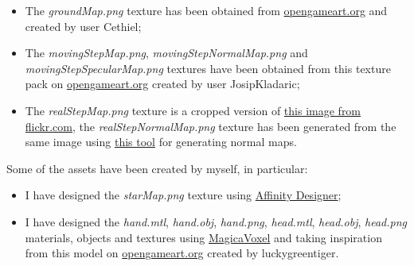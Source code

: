 \documentclass[12pt]{article}
\begin{document}
\begin{itemize}
\item The \textit{groundMap.png} texture has been obtained from \href{https://opengameart.org/content/tileable-bricks-ground-textures-set-1}{opengameart.org} and created by user Cethiel;
\item The \textit{movingStepMap.png}, \textit{movingStepNormalMap.png} and \textit{movingStepSpecularMap.png} textures have been obtained from this texture pack on \href{https://opengameart.org/content/metal-texture}{opengameart.org} created by user JosipKladaric;
\item The \textit{realStepMap.png} texture is a cropped version of \href{https://www.flickr.com/photos/seier/4357566390}{this image from flickr.com}, the \textit{realStepNormalMap.png} texture has been generated from the same image using \href{https://cpetry.github.io/NormalMap-Online/}{this tool} for generating normal maps.
\end{itemize}

\vspace{4mm}

Some of the assets have been created by myself, in particular:
\begin{itemize}
\item I have designed the \textit{starMap.png} texture using \href{https://affinity.serif.com/it/designer/}{Affinity Designer};
\item I have designed the \textit{hand.mtl}, \textit{hand.obj}, \textit{hand.png}, \textit{head.mtl}, \textit{head.obj}, \textit{head.png} materials, objects and textures using \href{https://ephtracy.github.io/}{MagicaVoxel} and taking inspiration from this model on \href{https://opengameart.org/content/hero-1}{opengameart.org} created by luckygreentiger.
\end{itemize}

\newpage
\end{document}
